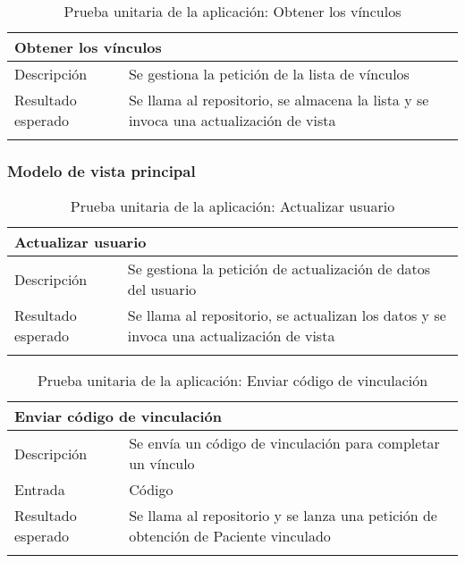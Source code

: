 \begin{longtable}{|p{} p{}|}
    \hline
    \multicolumn{2}{|l|}{\textbf{Obtener los vínculos}} \\ \hline 
    Descripción                 & Se gestiona la petición de la lista de vínculos \\ \hline
    Resultado esperado          & Se llama al repositorio, se almacena la lista y se invoca una actualización de vista \\ \hline
    \caption{Prueba unitaria de la aplicación: Obtener los vínculos}
    \label{cp:u:app:obtener_vinulos_vista}
\end{longtable}
    
\subsubsection{Modelo de vista principal}

\begin{longtable}{|p{} p{}|}
    \hline
    \multicolumn{2}{|l|}{\textbf{Actualizar usuario}} \\ \hline 
    Descripción                 & Se gestiona la petición de actualización de datos del usuario \\ \hline
    Resultado esperado          & Se llama al repositorio, se actualizan los datos y se invoca una actualización de vista \\ \hline
    \caption{Prueba unitaria de la aplicación: Actualizar usuario}
    \label{cp:u:app:actualizar_usuario_vista}
\end{longtable}
    
\vspace{-20pt}    
\begin{longtable}{|p{} p{}|}
    \hline
    \multicolumn{2}{|l|}{\textbf{Enviar código de vinculación}} \\ \hline 
    Descripción                 & Se envía un código de vinculación para completar un vínculo \\ \hline
    Entrada                     & Código \\ \hline
    Resultado esperado          & Se llama al repositorio y se lanza una petición de obtención de Paciente vinculado \\ \hline
    \caption{Prueba unitaria de la aplicación: Enviar código de vinculación}
    \label{cp:u:app:enviar_codigo_vinculacion_vista}
\end{longtable}
    
